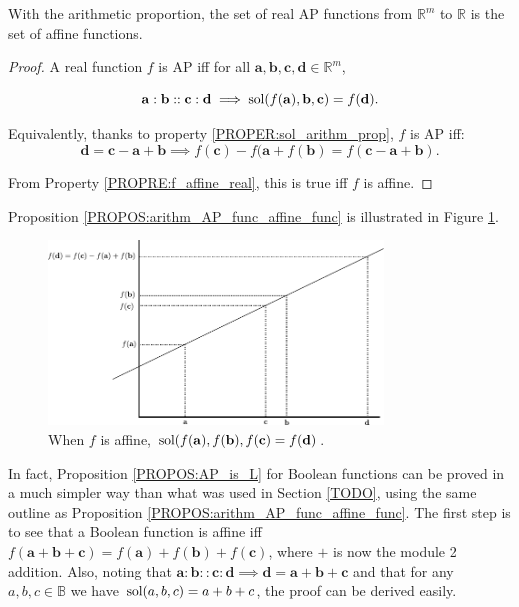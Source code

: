 \begin{proposition}
  \label{PROPOS:arithm_AP_func_affine_func}
  With the arithmetic proportion, the set of real AP functions from
  $\mathbb{R}^m$ to $\mathbb{R}$ is the set of affine functions.
\end{proposition}
\begin{proof}
  A real function $f$ is AP iff for all $\mathbf{a}, \mathbf{b}, \mathbf{c},
  \mathbf{d} \in \mathbb{R}^m$,

  $$\mathbf{a}: \mathbf{b}:: \mathbf{c}: \mathbf{d} \implies
  \text{sol}(f(\mathbf{a}), \mathbf{b}, \mathbf{c}) = f(\mathbf{d}).$$

  Equivalently, thanks to property \ref{PROPER:sol_arithm_prop},  $f$ is AP
  iff: $$\mathbf{d} = \mathbf{c} - \mathbf{a} + \mathbf{b} \implies
  f(\mathbf{c}) - f(\mathbf{a} +  f(\mathbf{b}) = f( \mathbf{c} - \mathbf{a} +
  \mathbf{b}).$$

  From Property \ref{PROPRE:f_affine_real}, this is true iff $f$ is affine.
\end{proof}

Proposition \ref{PROPOS:arithm_AP_func_affine_func} is illustrated in Figure
\ref{FIG:real_AP_func}.
\begin{figure}[!h]
\centering
  \includegraphics[width=3.5in]{figures/real_AP_fuction.pdf}
  \caption{When $f$ is affine, $\text{sol}(f(\mathbf{a}), f(\mathbf{b}),
  f(\mathbf{c}) = f(\mathbf{d})$.}
\label{FIG:real_AP_func}
\end{figure}


In fact, Proposition \ref{PROPOS:AP_is_L} for Boolean functions can be
proved in a much simpler way than what was used in Section \ref{TODO}, using
the same outline as Proposition \ref{PROPOS:arithm_AP_func_affine_func}. The
first step is to see that a Boolean function is affine iff $f(\mathbf{a} +
\mathbf{b} + \mathbf{c}) = f(\mathbf{a}) + f(\mathbf{b}) + f(\mathbf{c})$,
where $+$ is now the module 2 addition. Also, noting that $\mathbf{a} :
\mathbf{b} :: \mathbf{c} : \mathbf{d} \implies \mathbf{d} = \mathbf{a} +
\mathbf{b} + \mathbf{c}$ and that for any $a, b, c \in \mathbb{B}$ we have
$\text{sol}(a, b, c) = a + b + c$, the proof can be derived easily.


